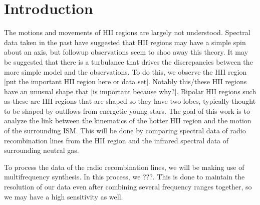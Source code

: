 \documentclass{article}
\begin{document}
\section{Introduction}

The motions and movements of HII regions are largely not understood. Spectral data taken in the past have suggested that HII regions may have a simple spin about an axis, but followup observations seem to shoo away this theory. It may be suggested that there is a turbulance that drives the discrepancies between the more simple model and the observations. To do this, we observe the HII region [put the important HII region here or data set]. Notably this/these HII regions have an unusual shape that [is important because why?]. Bipolar HII regions such as these are HII regions that are shaped so they have two lobes, typically thought to be shaped by outflows from energetic young stars. The goal of this work is to analyze the link between the kinematics of the hotter HII region and the motion of the surrounding ISM. This will be done by comparing spectral data of radio recombination lines from the HII region and the infrared spectral data of surrounding neutral gas. 

To process the data of the radio recombination lines, we will be making use of multifrequency synthesis. In this process, we ???. This is done to maintain the resolution of our data even after combining several frequency ranges together, so we may have a high sensitivity as well.
\end{document}

